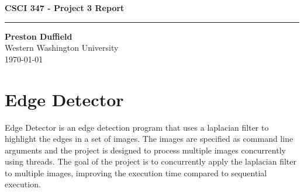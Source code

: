 \documentclass{article}
\begin{document}
\noindent
\begin{minipage}[t]{0.6\textwidth}
    \begin{flushleft}
        \LARGE\textbf{CSCI 347 - Project 3 Report} \\
        \vspace{6pt} %
        \hrule width 10cm
        \vspace{12pt}
        \large\textbf{Preston Duffield} \\
        \large Western Washington University \\
        \today
        \vspace{24pt}
    \end{flushleft}
\end{minipage}

\section*{Edge Detector}
Edge Detector is an edge detection program that uses a
laplacian filter to highlight the edges in a set of images.
The images are specified as command line arguments and the project
is designed to process multiple images concurrently using threads.
The goal of the project is to concurrently apply the laplacian
filter to multiple images, improving the execution time
compared to sequential execution. \\
\end{document}
